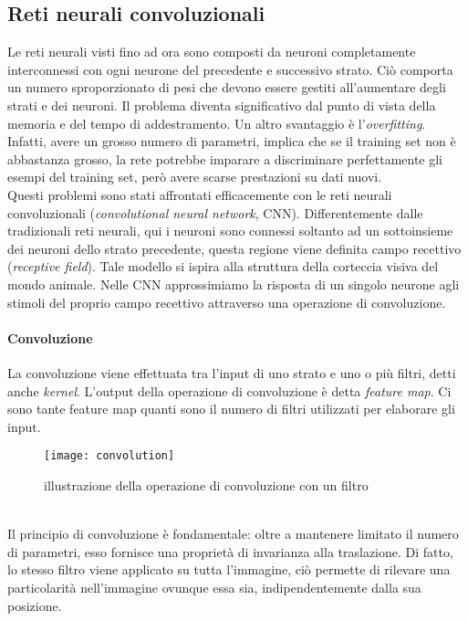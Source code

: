 \subsection{Reti neurali convoluzionali}
Le reti neurali visti fino ad ora sono composti da neuroni completamente interconnessi con ogni neurone del precedente e successivo strato. Ciò comporta un numero sproporzionato di pesi che devono essere gestiti all'aumentare degli strati e dei neuroni. Il problema diventa significativo dal punto di vista della memoria e del tempo di addestramento. Un altro svantaggio è l'\textit{overfitting}. Infatti, avere un grosso numero di parametri, implica che se il training set non è abbastanza grosso, la rete potrebbe imparare a discriminare perfettamente gli esempi del training set, però avere scarse prestazioni su dati nuovi.\\
Questi problemi sono stati affrontati efficacemente con le reti neurali convoluzionali (\textit{convolutional neural network}, CNN). Differentemente dalle tradizionali reti neurali, qui i neuroni sono connessi soltanto ad un sottoinsieme dei neuroni dello strato precedente, questa regione viene definita campo recettivo (\textit{receptive field}). Tale modello si ispira alla struttura della corteccia visiva del mondo animale. Nelle CNN approssimiamo la risposta di un singolo neurone agli stimoli del proprio campo recettivo attraverso una operazione di convoluzione.
\paragraph{Convoluzione} 
La convoluzione viene effettuata tra l'input di uno strato e uno o più filtri, detti anche \textit{kernel}. L'output della operazione di convoluzione è detta \textit{feature map}. Ci sono tante feature map quanti sono il numero di filtri utilizzati per elaborare gli input. 
\begin{figure}[ht]
    \centering
    \texttt{[image: convolution]}
    \caption[Esempio di convoluzione]{illustrazione della operazione di convoluzione con un filtro \cite{cnn}}
\end{figure}\\
Il principio di convoluzione è fondamentale: oltre a mantenere limitato il numero di parametri, esso fornisce una proprietà di invarianza alla traslazione. Di fatto, lo stesso filtro viene applicato su tutta l'immagine, ciò permette di rilevare una particolarità nell'immagine ovunque essa sia, indipendentemente dalla sua posizione. 
